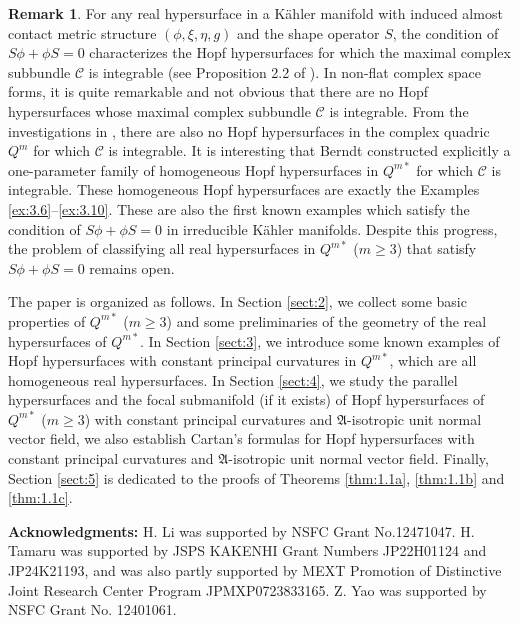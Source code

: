 \documentclass[reqno]{amsart}%
\theoremstyle{definition}
\newtheorem{remark}{Remark}[section]
\numberwithin{equation}{section}
\begin{document}
\begin{remark}\label{rem:1.2}
For any real hypersurface in a K\"{a}hler manifold
with induced almost contact metric structure $(\phi,\xi,\eta,g)$ and the shape operator $S$, the
condition of $S\phi+\phi S=0$ characterizes the Hopf hypersurfaces for which
the maximal complex subbundle $\mathcal{C}$ is integrable (see Proposition 2.2 of \cite{B-2023}).
In non-flat complex space forms, it is quite remarkable and not obvious that
there are no Hopf hypersurfaces whose maximal complex subbundle $\mathcal{C}$ is integrable.
From the investigations in \cite{BS-2022}, there are also no Hopf
hypersurfaces in the complex quadric $Q^m$ for which $\mathcal{C}$ is integrable.
It is interesting that Berndt \cite{B-2023} constructed explicitly a one-parameter family of homogeneous Hopf hypersurfaces in $Q^{m*}$ for which $\mathcal{C}$ 
is integrable. These homogeneous Hopf hypersurfaces are exactly the Examples \ref{ex:3.6}--\ref{ex:3.10}.
These are also the first known examples which satisfy the condition of $S\phi+\phi S=0$ in irreducible K\"ahler manifolds. Despite this progress, the problem of classifying all real hypersurfaces in $Q^{m*}$ ($m\geq3$) that satisfy 
$S\phi+\phi S=0$ remains open.
\end{remark}


The paper is organized as follows. In Section \ref{sect:2}, we collect some basic
properties of $Q^{m*}$ ($m\geq3$) and some preliminaries of the geometry of the real hypersurfaces of $Q^{m*}$.
In Section \ref{sect:3}, we introduce some known examples of Hopf hypersurfaces with constant principal curvatures in $Q^{m*}$, which are all homogeneous real hypersurfaces. In Section \ref{sect:4}, we study the parallel hypersurfaces and the focal submanifold (if it exists) of Hopf hypersurfaces of $Q^{m*}$ ($m\geq3$) with constant principal curvatures and $\mathfrak{A}$-isotropic unit normal vector field, we also establish Cartan's formulas for Hopf hypersurfaces with constant principal curvatures and $\mathfrak{A}$-isotropic unit normal vector field. Finally, Section \ref{sect:5} is dedicated to
the proofs of Theorems \ref{thm:1.1a},  \ref{thm:1.1b} and \ref{thm:1.1c}.

\textbf{Acknowledgments:}
H. Li was supported by NSFC Grant No.12471047. H. Tamaru was supported by JSPS KAKENHI Grant Numbers JP22H01124 and JP24K21193, and was also partly supported by MEXT Promotion of Distinctive Joint
Research Center Program JPMXP0723833165. Z. Yao was supported by NSFC Grant No. 12401061.
\end{document}

